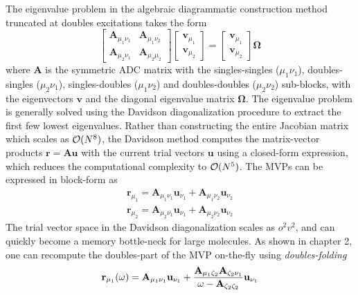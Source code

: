 The eigenvalue problem in the algebraic diagrammatic construction method truncated at doubles excitations takes the form
\begin{equation}
\begin{bmatrix}
\mathbf{A}_{\mu_1\nu_1} & \mathbf{A}_{\mu_1\nu_2} \\
\mathbf{A}_{\mu_2\nu_1} & \mathbf{A}_{\mu_2\mu_2}
\end{bmatrix} 
\begin{bmatrix}
\mathbf{v}_{\mu_1} \\
\mathbf{v}_{\mu_2}
\end{bmatrix}
=  
\begin{bmatrix}
\mathbf{v}_{\mu_1} \\
\mathbf{v}_{\mu_2}
\end{bmatrix}
\mathbf{\Omega}
\end{equation}
\noindent where $\mathbf{A}$ is the symmetric ADC matrix with the singles-singles ($\mu_1\nu_1$), doubles-singles ($\mu_2\nu_1$), singles-doubles ($\mu_1\nu_2$) and doubles-doubles ($\mu_2\nu_2$) sub-blocks, with the eigenvectors $\mathbf{v}$ and the diagonal eigenvalue matrix $\boldsymbol{\Omega}$. The eigenvalue problem is generally solved using the Davidson diagonalization procedure to extract the first few lowest eigenvalues. Rather than constructing the entire Jacobian matrix which scales as $\mathcal{O}(N^{8})$, the Davidson method computes the matrix-vector products $\mathbf{r} = \mathbf{A} \mathbf{u}$ with the current trial vectors $\mathbf{u}$ using a closed-form expression, which reduces the computational complexity to $\mathcal{O}(N^{5})$. The MVPs can be expressed in block-form as
\begin{equation}
\begin{split}
\mathbf{r}_{\mu_1} = \mathbf{A}_{\mu_1\nu_1} \mathbf{u}_{\nu_1} + \mathbf{A}_{\mu_1\nu_2} \mathbf{u}_{\nu_2} \\
\mathbf{r}_{\mu_2} = \mathbf{A}_{\mu_2\nu_1} \mathbf{u}_{\nu_1} + \mathbf{A}_{\mu_2\nu_2} \mathbf{u}_{\nu_2}
\end{split} 
\end{equation}
\noindent The trial vector space in the Davidson diagonalization scales as $o^2v^2$, and can quickly become a memory bottle-neck for large molecules. As shown in chapter 2, one can recompute the doubles-part of the MVP on-the-fly using \emph{doubles-folding}
\begin{equation}
\mathbf{r}_{\mu_1}(\omega) = \mathbf{A}_{\mu_1\nu_1} \mathbf{u}_{\nu_1} + \frac{\mathbf{A}_{\mu_1\zeta_2} \mathbf{A}_{\zeta_2\nu_1}}{\omega - \mathbf{A}_{\zeta_2\zeta_2}} \mathbf{u}_{\nu_1} 
\end{equation} 
